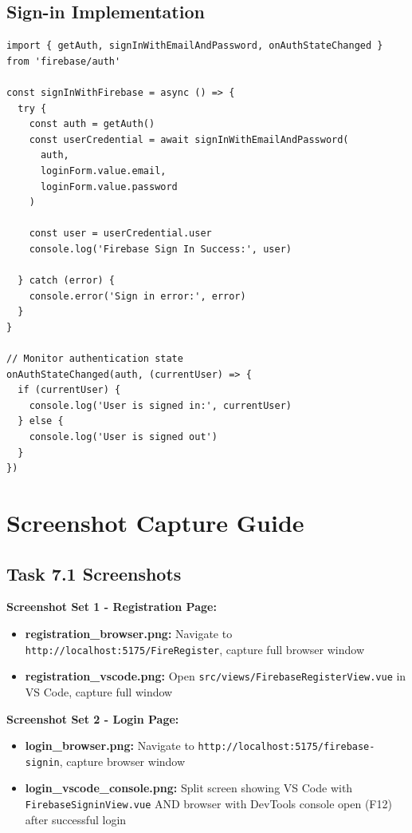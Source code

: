 \documentclass[11pt,a4paper]{article}
\begin{document}
\subsection{Sign-in Implementation}

\begin{lstlisting}[caption=Key sign-in function from FirebaseSigninView.vue]
import { getAuth, signInWithEmailAndPassword, onAuthStateChanged } from 'firebase/auth'

const signInWithFirebase = async () => {
  try {
    const auth = getAuth()
    const userCredential = await signInWithEmailAndPassword(
      auth, 
      loginForm.value.email, 
      loginForm.value.password
    )
    
    const user = userCredential.user
    console.log('Firebase Sign In Success:', user)
    
  } catch (error) {
    console.error('Sign in error:', error)
  }
}

// Monitor authentication state
onAuthStateChanged(auth, (currentUser) => {
  if (currentUser) {
    console.log('User is signed in:', currentUser)
  } else {
    console.log('User is signed out')
  }
})
\end{lstlisting}

\newpage


\section{Screenshot Capture Guide}

\subsection{Task 7.1 Screenshots}

\textbf{Screenshot Set 1 - Registration Page:}
\begin{itemize}
    \item \textbf{registration\_browser.png:} Navigate to \texttt{http://localhost:5175/FireRegister}, capture full browser window
    \item \textbf{registration\_vscode.png:} Open \texttt{src/views/FirebaseRegisterView.vue} in VS Code, capture full window
\end{itemize}

\textbf{Screenshot Set 2 - Login Page:}
\begin{itemize}
    \item \textbf{login\_browser.png:} Navigate to \texttt{http://localhost:5175/firebase-signin}, capture browser window
    \item \textbf{login\_vscode\_console.png:} Split screen showing VS Code with \texttt{FirebaseSigninView.vue} AND browser with DevTools console open (F12) after successful login
\end{itemize}
\end{document}
